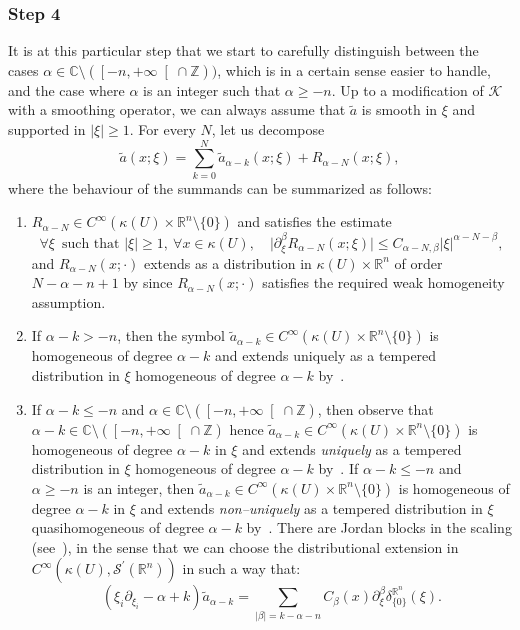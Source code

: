 \documentclass[JEP,XML,SOM,Unicode]{cedram}
\let\pazocal\mathscr
\theoremstyle{definition}
\let\cv\alpha
\let\asigma a
\newcommand{\clopen}[1]{\mathopen{}\mathclose{\left[#1 \right[}}
\newcommand{\step}[1]{\subsubsection*{Step #1}}
\begin{document}
\step{4}
It is at this particular step that we start to carefully distinguish between the cases $\alpha\in\mathbb{C}\setminus(\clopen{-n,+\infty}\cap \mathbb{Z}))$, which is in a certain sense easier to handle, and the case where $\alpha$ is an integer such that $\alpha\geqslant -n$. Up to a modification of $\pazocal{K}$ with a smoothing operator, we can always assume that $\tilde{\asigma}$ is smooth in $\xi$ and supported in $\vert \xi\vert\geqslant 1$.
For every $N$, let us decompose
\[
\tilde{\asigma}(x;\xi)=\sum_{k=0}^N \tilde{\asigma}_{\cv-k}(x;\xi)+R_{\cv-N}(x;\xi),
\]
where the behaviour of the summands can be summarized as follows:
\begin{enumerate}
\item $R_{\cv-N}\in C^\infty\left(\kappa(U)\times \mathbb{R}^n\setminus\{0\} \right)$ and satisfies the estimate
\[
\forall \xi\, \text{ such that } \vert\xi\vert\geqslant 1, \ \forall x\in \kappa(U),\quad \vert \partial_\xi^\beta R_{\cv-N}(x;\xi) \vert\leqslant C_{\cv-N,\beta} \vert\xi\vert^{{\cv-N-\beta} },
\]
and $R_{\cv-N}(x;\cdot) $ extends as a distribution in $\kappa(U)\times \mathbb{R}^n $
of order $ N- \cv-n +1$ by \cite[Th.\,1.8]{DangAHP} since $R_{\cv-N}(x;\cdot) $ satisfies the required weak homogeneity assumption.
\item If $\cv-k>-n$, then the symbol $ \tilde{\asigma}_{\cv-k}\in C^\infty\left(\kappa(U)\times \mathbb{R}^n\setminus\{0\} \right)$ is homogeneous of degree $\cv-k $
and extends uniquely as a tempered distribution in $\xi$ homogeneous of degree $\cv-k$ by~\cite[Th.\,3.2.3]{H}.
\item
If $\cv-k\leqslant -n$ and
$\cv\in\mathbb{C}\setminus(\clopen{-n,+\infty}\cap \mathbb{Z})$,
then observe that $\cv-k\in\mathbb{C}\setminus(\clopen{-n,+\infty}\cap \mathbb{Z}) $ hence
$ \tilde{\asigma}_{\cv-k}\in C^\infty\left(\kappa(U)\times \mathbb{R}^n\setminus\{0\} \right)$ is homogeneous of degree $\cv-k $ in $\xi$
and extends \emph{uniquely} as a tempered distribution in $\xi$ homogeneous of degree $\cv-k$ by~\cite[Th.\,3.2.4]{H}. If $\cv-k\leqslant -n$ and
$\cv\geqslant -n$ is an integer,
then $ \tilde{\asigma}_{\cv-k}\in C^\infty\left(\kappa(U)\times \mathbb{R}^n\setminus\{0\} \right)$ is homogeneous of degree $\cv-k $ in $\xi$
and extends \emph{non--uniquely} as a tempered distribution in $\xi$ quasihomogeneous of degree $\cv-k$ by~\cite[Th.\,3.2.4]{H}.
There are Jordan blocks in the scaling (see~\cite[(3.2.24)$^\prime$]{H}), in the sense that we can choose the distributional extension in $C^\infty(\kappa(U),\pazocal{S}^\prime(\mathbb{R}^n))$ in such a way that:
\[
\left(\xi_i\partial_{\xi_i}-\cv+k\right) \tilde{\asigma}_{\cv-k}= \sum_{\vert \beta\vert=k-\cv-n} C_\beta(x) \partial_\xi^\beta\delta^{\mathbb{R}^n}_{\{0\}}(\xi).
\]
\end{enumerate}
\end{document}
